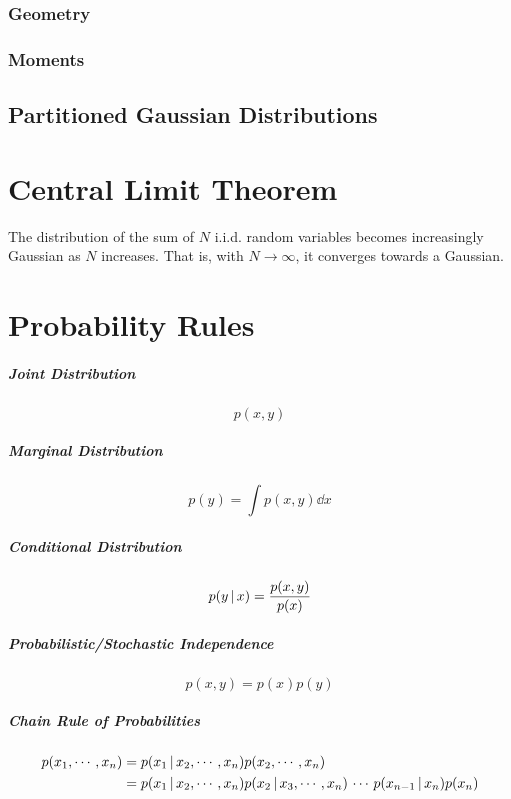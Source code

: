 		\subsubsection{Geometry} %

		\subsubsection{Moments} %

	\subsection{Partitioned Gaussian Distributions} %

\section{Central Limit Theorem}
	The distribution of the sum of \(N\) i.i.d. random variables becomes increasingly Gaussian as \(N\) increases. That is, with \(N \to \infty\), it converges towards a Gaussian.

\section{Probability Rules}
\subparagraph{Joint Distribution}
\begin{equation}
	p(x, y)
\end{equation}

\subparagraph{Marginal Distribution}
\begin{equation}
	p(y) = \int p(x, y) \dd{x}
\end{equation}

\subparagraph{Conditional Distribution}
\begin{equation}
	p(y \,\vert\, x) = \frac{p(x, y)}{p(x)}
\end{equation}

\subparagraph{Probabilistic/Stochastic Independence}
	\begin{equation}
		p(x, y) = p(x) p(y)
	\end{equation}

	\subparagraph{Chain Rule of Probabilities}
		\begin{align}
			p(x_1, \cdots, x_n) & = p(x_1 \,\vert\, x_2, \cdots, x_n) p(x_2, \cdots, x_n)                                                      \\
			                    & = p(x_1 \,\vert\, x_2, \cdots, x_n) p(x_2 \,\vert\, x_3, \cdots, x_n) \,\cdots\, p(x_{n - 1} \,\vert\, x_n) p(x_n)
		\end{align}

